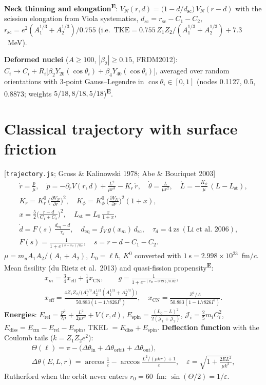 \documentclass[11pt,a4paper]{article}
\newcommand{\file}[1]{\texttt{\small #1}}
\newcommand{\src}[1]{\hfill{\small\color{gray}[#1]}}
\newcommand{\emp}{\textsuperscript{\color{orange!80!black}\textbf{E}}}
\begin{document}
\textbf{Neck thinning and elongation}\emp: $V_N(r,d) = \big(1-d/d_\text{sc}\big)\,V_N(r-d)$ with the scission elongation from
Viola systematics, $d_\text{sc} = r_\text{sc}-C_1-C_2$, $r_\text{sc} = e^2(A_1^{1/3}+A_2^{1/3})/0.755$ (i.e.\
$\text{TKE} = 0.755\,Z_1Z_2/(A_1^{1/3}+A_2^{1/3})+7.3$~MeV).

\textbf{Deformed nuclei} ($A\ge100$, $|\beta_2|\ge0.15$, FRDM2012): $C_i \to C_i + R_i\big[\beta_2Y_{20}(\cos\theta_i)+\beta_4Y_{40}(\cos\theta_i)\big]$,
averaged over random orientations with 3-point Gauss--Legendre in $\cos\theta_i\in[0,1]$ (nodes 0.1127, 0.5, 0.8873; weights
$5/18, 8/18, 5/18$)\emp.

\section{Classical trajectory with surface friction}
\src{\file{trajectory.js}; Gross \& Kalinowski 1978; Abe \& Bouriquet 2003}
\begin{gather}
\dot r = \frac{p}{\mu},\quad \dot p = -\partial_r V(r,d) + \frac{L^2}{\mu r^3} - K_r\,\dot r,\quad
\dot\theta = \frac{L}{\mu r^2},\quad \dot L = -\frac{K_\phi}{\mu}\,(L-L_\text{st}),\\
K_r = K_r^0\,\Big(\frac{\partial V_N}{\partial r}\Big)^2,\quad K_\phi = K_\phi^0\,\Big(\frac{\partial V_N}{\partial r}\Big)^2(1+x),\\
x = \frac52\Big(\frac{r-d}{C_1+C_2}\Big)^2,\quad L_\text{st} = L_0\,\frac{x}{1+x},\\
\dot d = F(s)\,\frac{d_\text{eq}-d}{\tau_d},\quad d_\text{eq} = f_V\,g(x_m)\,d_\text{sc},\quad \tau_d = 4~\text{zs}\ (\text{Li et al.\ 2006}),\\
F(s) = \frac{1}{1+e^{(s-s_C)/a_C}},\quad s = r-d-C_1-C_2 .
\end{gather}
$\mu = m_u A_1A_2/(A_1+A_2)$, $L_0 = \ell\hbar$, $K^0$ converted with $1~\text{s} = 2.998\times10^{23}$~fm/$c$.
Mean fissility (du Rietz et al.\ 2013) and quasi-fission propensity\emp:
\begin{gather}
x_m = \tfrac34 x_\text{eff} + \tfrac14 x_\text{CN},\qquad g = \frac{1}{1+e^{-(x_m-0.79)/0.02}},\\
x_\text{eff} = \frac{4Z_1Z_2/\big(A_1^{1/3}A_2^{1/3}(A_1^{1/3}+A_2^{1/3})\big)}{50.883(1-1.7826I^2)},\quad
x_\text{CN} = \frac{Z^2/A}{50.883(1-1.7826I^2)}.
\end{gather}
\textbf{Energies}: $E_\text{rel} = \frac{p^2}{2\mu}+\frac{L^2}{2\mu r^2}+V(r,d)$, $E_\text{spin} = \frac{(L_0-L)^2}{2(\mathcal J_1+\mathcal J_2)}$,
$\mathcal J_i = \frac25 m_i C_i^2$, $E_\text{diss} = E_\text{cm}-E_\text{rel}-E_\text{spin}$, TKEL $= E_\text{diss}+E_\text{spin}$.
\textbf{Deflection function} with the Coulomb tails ($k = Z_1Z_2e^2$):
\begin{gather}
\Theta(\ell) = \pi - \big(\Delta\theta_\text{in} + \Delta\theta_\text{orbit} + \Delta\theta_\text{out}\big),\\
\Delta\theta(E,L,r) = \arccos\frac1\varepsilon - \arccos\frac{L^2/(\mu k r)+1}{\varepsilon},\quad
\varepsilon = \sqrt{1+\frac{2EL^2}{\mu k^2}},
\end{gather}
Rutherford when the orbit never enters $r_0 = 60$~fm: $\sin(\Theta/2) = 1/\varepsilon$.
\end{document}
